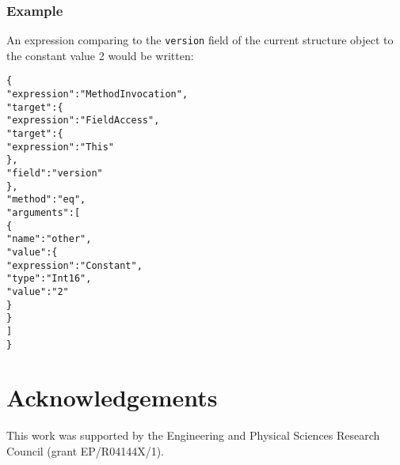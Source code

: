 \documentclass[10pt,twocolumn,a4paper]{article}
\newcommand{\code}[1]{\texttt{#1}}
\begin{document}
\subsubsection{Example}

An expression comparing to the \code{version} field of the current
structure object to the constant value 2 would be written:
\footnotesize
\begin{alltt}
  \{
     "expression" : "MethodInvocation",
     "target"     : \{
       "expression" : "FieldAccess",
       "target" : \{
         "expression" : "This"
       \},
       "field"    : "version"
     \},
     "method"     : "eq",
     "arguments"  : [
       \{
         "name"  : "other",
         "value" : \{
           "expression" : "Constant",
           "type"       : "Int16",
           "value"      : "2"
         \}
       \}
     ]
  \}
\end{alltt}
\normalsize

\section{Acknowledgements}

This work was supported by the Engineering and Physical Sciences Research
Council (grant EP/R04144X/1).



\ifpdf
  \ifdefined\pdftrailerid
    \pdftrailerid{}
  \fi
\fi
\end{document}
